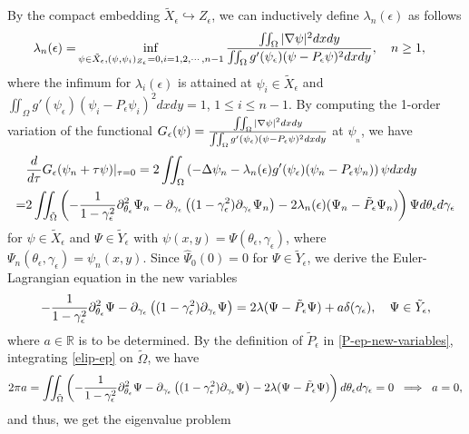 \documentclass[1 [leqno, 11pt]{amsart}
\numberwithin{equation}{section}
\let\ep=\epsilon
\let\pa=\partial
\begin{document}
\begin{CJK*}{GBK}{song}
By the compact embedding  $\tilde X_\ep\hookrightarrow Z_{\ep}$,   we can
inductively define $\lambda_{n}(\ep)$ as follows
\begin{align}\label{variational problem2-ep}
\lambda_n(\ep)=& \inf_{\psi \in \tilde X_\ep, (\psi, \psi_{i})_{Z_\ep} = 0, i = 1, 2, \cdots, n-1}{\iint_\Omega|\nabla\psi|^2dxdy\over\iint_\Omega g'(\psi_\ep)(\psi - P_\ep\psi)^2dxdy},\quad n\geq1,
\end{align}
where the  infimum for $\lambda_i(\ep)$ is attained at $\psi_{i}\in \tilde X_\ep$ and $\iint_\Omega g'(\psi_\ep)(\psi_{i} - {P_\ep}\psi_{i})^2 dxdy = 1$, $1\leq i \leq n-1$.
By computing the 1-order variation of the functional $G_\ep(\psi)={\iint_\Omega|\nabla\psi|^2dxdy\over\iint_\Omega g'(\psi_\ep)(\psi - P_\ep\psi)^2dxdy}$ at $\psi_{_n}$,  we have
\begin{align*}
&\frac{d}{d \tau} G_\ep(\psi_{n} + \tau \psi)|_{\tau = 0} = 2\iint_{\Omega} \left(-\Delta\psi_n - \lambda_n(\epsilon)g'(\psi_\ep)(\psi_n - P_\ep\psi_n)\right)\psi dxdy\\
=&2\iint_{\tilde\Omega}\left(-{1\over1-\gamma_\ep^2}\pa_{\theta_\ep}^2\Psi_n-\pa_{\gamma_\ep}\left((1-\gamma_\ep^2)\pa_{\gamma_\ep}\Psi_n\right)
-2\lambda_n(\epsilon)(\Psi_n-\tilde P_\ep\Psi_n)\right)\Psi d\theta_\ep d\gamma_\ep
\end{align*}
for $\psi\in \tilde X_\ep$ and $\Psi\in \tilde Y_\ep$ with $\psi(x,y)=\Psi(\theta_\ep,\gamma_\ep)$, where $\Psi_n(\theta_\ep,\gamma_\ep)=\psi_n(x,y)$.
Since   $\widehat{\Psi}_0(0)=0$ for $\Psi\in \tilde Y_\ep$, we
derive the Euler-Lagrangian equation in the new variables
\begin{align}\label{elip-ep}
-{1\over1-\gamma_\ep^2}\pa_{\theta_\ep}^2\Psi-\pa_{\gamma_\ep}\left((1-\gamma_\ep^2)\pa_{\gamma_\ep}\Psi\right)
=2\lambda(\Psi-\tilde P_\ep\Psi)+a\delta(\gamma_\ep), \quad \Psi \in \tilde{Y}_\ep,
\end{align}
where $a\in\mathbb{R}$ is to be determined. By the definition of  $\tilde P_\ep$ in \eqref{P-ep-new-variables}, integrating \eqref{elip-ep} on $\tilde \Omega$, we have
$$
2\pi a=\iint_{\tilde \Omega}\left(-{1\over1-\gamma_\ep^2}\pa_{\theta_\ep}^2\Psi-\pa_{\gamma_\ep}\left((1-\gamma_\ep^2)\pa_{\gamma_\ep}\Psi\right)
-2\lambda(\Psi-\tilde P_\ep\Psi)\right) d\theta_\ep d\gamma_\ep=0\;\;\Longrightarrow \;\;a=0,
$$
and thus,  we get the eigenvalue problem

\end{CJK*}
\end{document}
